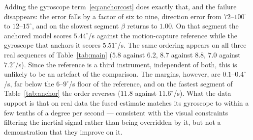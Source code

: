 \documentclass[journal]{IEEEtran}
\begin{document}
Adding the gyroscope term~\eqref{eq:anchorcost} does exactly that, and the
failure disappears: the error falls by a factor of six to nine, direction error
from $72$--$100^\circ$ to $12$--$15^\circ$, and on the slowest segment $\beta$
returns to $1.00$. On that segment the anchored model scores $5.44^\circ$/s
against the motion-capture reference while the gyroscope that anchors it scores
$5.51^\circ$/s. The same ordering appears on all three real sequences of
Table~\ref{tab:main} ($5.8$ against $6.2$, $8.7$ against $8.8$,
$7.0$ against $7.2^\circ$/s). Since the reference is a third instrument,
independent of both, this is unlikely to be an artefact of the comparison. The
margins, however, are $0.1$--$0.4^\circ$/s, far below the $6$--$9^\circ$/s
floor of the reference, and on the fastest segment of Table~\ref{tab:anchor}
the order reverses ($11.8$ against $11.6^\circ$/s). What the data support is
that on real data the fused estimate matches its gyroscope to within a few
tenths of a degree per second --- consistent with the visual constraints
filtering the inertial signal rather than being overridden by it, but not a
demonstration that they improve on it.
\end{document}
